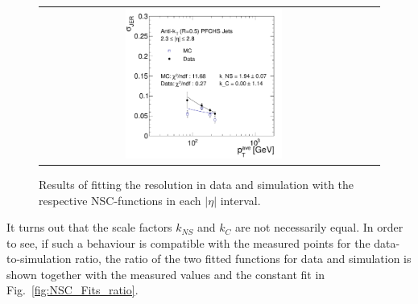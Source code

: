 \begin{description}
\begin{figure}[!htp]
\begin{tabular}{cc}
                \includegraphics[width=0.49\textwidth]{figures/Pythia_NSCFit_Eta4_kNS_kC.pdf} 
  \end{tabular}
  \caption{Results of fitting the resolution in data and simulation with the respective NSC-functions in each $|\eta|$ interval.}
  \label{fig:NSC_Fits_3}
\end{figure} 

It turns out that the scale factors $k_{NS}$ and $k_{C}$ are not necessarily equal. In order to see, if such a behaviour is compatible with the measured points for the data-to-simulation ratio, the ratio of the two fitted functions for data and simulation is shown together with the measured values and the constant fit in Fig.~\ref{fig:NSC_Fits_ratio}. 


\end{description}
